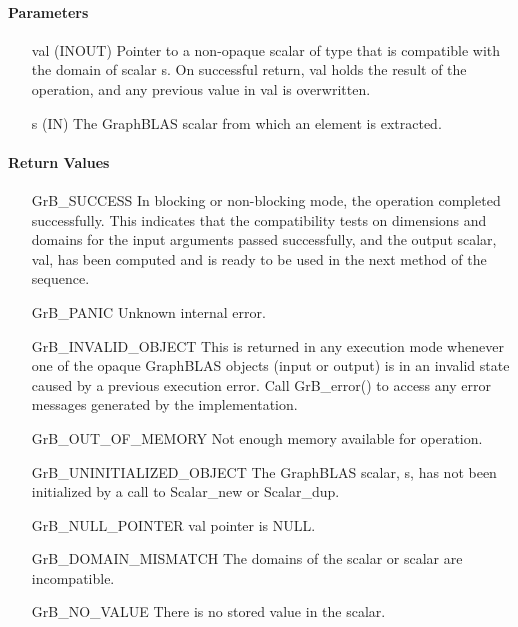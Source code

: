 \paragraph{Parameters}

\begin{itemize}[leftmargin=1in]
    \item[{\sf val}]   ({\sf INOUT}) Pointer to a non-opaque scalar of type that is 
    compatible with the domain of scalar {\sf s}. On successful return, {\sf val} 
    holds the result of the operation, and any previous value in {\sf val} is 
    overwritten.

    \item[{\sf s}]     ({\sf IN}) The GraphBLAS scalar from which an element
    is extracted.
\end{itemize}

\paragraph{Return Values}

\begin{itemize}[leftmargin=2.1in]
    \item[{\sf GrB\_SUCCESS}]  In blocking or non-blocking mode, the operation 
    completed successfully. This indicates that the compatibility tests on 
    dimensions and domains for the input arguments passed successfully, and
    the output scalar, {\sf val}, has been computed and is ready to be used in 
    the next method of the sequence.

    \item[{\sf GrB\_PANIC}]   Unknown internal error.
    
    \item[{\sf GrB\_INVALID\_OBJECT}] This is returned in any execution mode 
    whenever one of the opaque GraphBLAS objects (input or output) is in an invalid 
    state caused by a previous execution error.  Call {\sf GrB\_error()} to access 
    any error messages generated by the implementation.

    \item[{\sf GrB\_OUT\_OF\_MEMORY}]  Not enough memory available for operation.
    
    \item[{\sf GrB\_UNINITIALIZED\_OBJECT}]  The GraphBLAS scalar, {\sf s}, has 
    not been initialized by a call to {\sf Scalar\_new} or {\sf Scalar\_dup}.
    
    \item[{\sf GrB\_NULL\_POINTER}]    {\sf val} pointer is {\sf NULL}.
    
    \item[{\sf GrB\_DOMAIN\_MISMATCH}]     The domains of the scalar or scalar
    are incompatible.

    \item[{\sf GrB\_NO\_VALUE}]  There is no stored value in the scalar.
\end{itemize}

